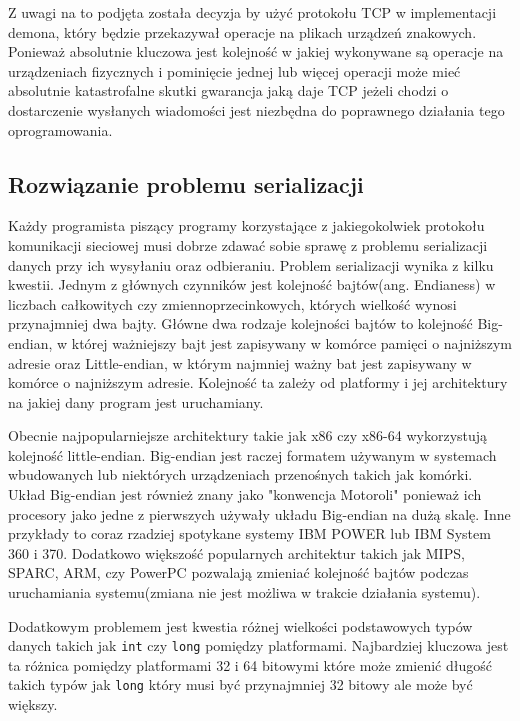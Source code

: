 \documentclass[10pt]{scrartcl}
\begin{document}
Z uwagi na to podjęta została decyzja by użyć protokołu TCP w implementacji demona, który będzie przekazywał operacje na plikach urządzeń znakowych. Ponieważ absolutnie kluczowa jest kolejność w jakiej wykonywane są operacje na urządzeniach fizycznych i pominięcie jednej lub więcej operacji może mieć absolutnie katastrofalne skutki gwarancja jaką daje TCP jeżeli chodzi o dostarczenie wysłanych wiadomości jest niezbędna do poprawnego działania tego oprogramowania.

\subsection{Rozwiązanie problemu serializacji}

Każdy programista piszący programy korzystające z jakiegokolwiek protokołu komunikacji sieciowej musi dobrze zdawać sobie sprawę z problemu serializacji danych przy ich wysyłaniu oraz odbieraniu. Problem serializacji wynika z kilku kwestii. Jednym z głównych czynników jest kolejność bajtów(ang. Endianess) w liczbach całkowitych czy zmiennoprzecinkowych, których wielkość wynosi przynajmniej dwa bajty. Główne dwa rodzaje kolejności bajtów to kolejność Big-endian, w której ważniejszy bajt jest zapisywany w komórce pamięci o najniższym adresie oraz Little-endian, w którym najmniej ważny bat jest zapisywany w komórce o najniższym adresie. Kolejność ta zależy od platformy i jej architektury na jakiej dany program jest uruchamiany.

Obecnie najpopularniejsze architektury takie jak x86 czy x86-64 wykorzystują kolejność little-endian. Big-endian jest raczej formatem używanym w systemach wbudowanych lub niektórych urządzeniach przenośnych takich jak komórki. Układ Big-endian jest również znany jako "konwencja Motoroli" ponieważ ich procesory jako jedne z pierwszych używały układu Big-endian na dużą skalę. Inne przykłady to coraz rzadziej spotykane systemy IBM POWER lub IBM System 360 i 370. Dodatkowo większość popularnych architektur takich jak MIPS, SPARC, ARM, czy PowerPC pozwalają zmieniać kolejność bajtów podczas uruchamiania systemu(zmiana nie jest możliwa w trakcie działania systemu).

Dodatkowym problemem jest kwestia różnej wielkości podstawowych typów danych takich jak \texttt{int} czy \texttt{long} pomiędzy platformami. Najbardziej kluczowa jest ta różnica pomiędzy platformami 32 i 64 bitowymi które może zmienić długość takich typów jak \texttt{long} który musi być przynajmniej 32 bitowy ale może być większy.
\end{document}
